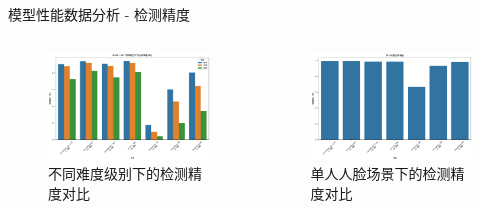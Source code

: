 \documentclass{beamer}
\begin{document}
\begin{frame}{模型性能数据分析 - 检测精度}
    \begin{columns}
        \begin{column}{0.5\textwidth}
            \begin{figure}
                \includegraphics[width=\textwidth]{pic/ap_comparison.png}
                \caption{不同难度级别下的检测精度对比}
            \end{figure}
        \end{column}
        \begin{column}{0.5\textwidth}
            \begin{figure}
                \includegraphics[width=\textwidth]{pic/one_face_ap.png}
                \caption{单人人脸场景下的检测精度对比}
            \end{figure}
        \end{column}
    \end{columns}
\end{frame}
\end{document}
